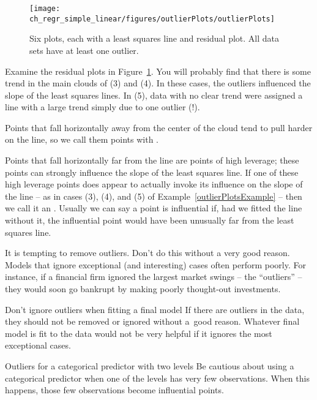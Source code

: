 \begin{figure}
\centering
\texttt{[image: ch\_regr\_simple\_linear/figures/outlierPlots/outlierPlots]}
\caption{Six plots, each with a least squares line and residual plot. All data sets have at least one outlier.}
\label{outlierPlots}
\end{figure}

Examine the residual plots in Figure~\ref{outlierPlots}. You will probably find that there is some trend in the main clouds of (3) and (4). In these cases, the outliers influenced the slope of the least squares lines. In (5), data with no clear trend were assigned a line with a large trend simply due to one outlier (!).
 
 \begin{termBox}{
Points that fall horizontally away from the center of the cloud tend to pull harder on the line, so we call them points with .}
\end{termBox}

Points that fall horizontally far from the line are points of high leverage; these points can strongly influence the slope of the least squares line. If one of these high leverage points does appear to actually invoke its influence on the slope of the line -- as in cases (3), (4), and (5) of Example~\ref{outlierPlotsExample} -- then we call it an . Usually we can say a point is influential if, had we fitted the line without it, the influential point would have been unusually far from the least squares line.

It is tempting to remove outliers. Don't do this without a very good reason. Models that ignore exceptional (and interesting) cases often perform poorly. For instance, if a financial firm ignored the largest market swings -- the ``outliers'' --  they would soon go bankrupt by making poorly thought-out investments.

\begin{caution}{Don't ignore outliers when fitting a final model}
{If there are outliers in the data, they should not be removed or ignored without a~good reason. Whatever final model is fit to the data would not be very helpful if it ignores the most exceptional cases.}
\end{caution}

\begin{caution}{Outliers for a categorical predictor with two levels}{
Be cautious about using a categorical predictor when one of the levels has very few observations. When this happens, those few observations become influential points.}
\end{caution}



